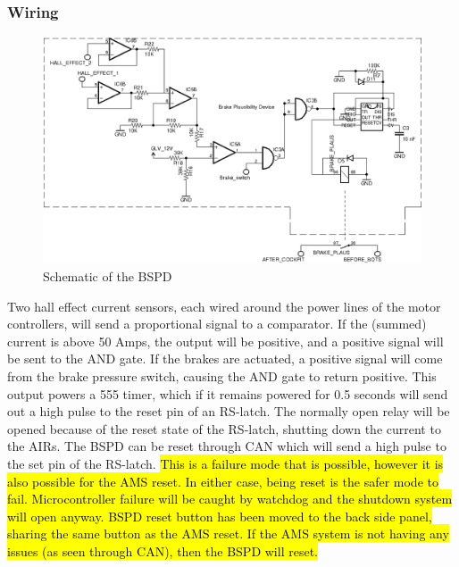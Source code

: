 \documentclass{article}
\DeclareRobustCommand{\hlr}[1]{{\sethlcolor{red}\hl{#1}}}
\begin{document}
        \subsubsection{Wiring}

            \begin{figure}[H]
                \centering
                \includegraphics[width = 0.9 \textwidth]{BSPD}
                \caption{Schematic of the BSPD}
                \label{BSPDschem}
            \end{figure}

Two hall effect current sensors, each wired around the power lines of the motor controllers, will send a proportional signal to a comparator. If the (summed) current is above 50 Amps, the output will be positive, and a positive signal will be sent to the AND gate. If the brakes are actuated, a positive signal will come from the brake pressure switch, causing the AND gate to return positive. This output powers a 555 timer, which if it remains powered for 0.5 seconds will send out a high pulse to the reset pin of an RS-latch. The normally open relay will be opened because of the reset state of the RS-latch, shutting down the current to the AIRs. The BSPD can be reset through CAN which will send a high pulse to the set pin of the RS-latch. \hlr{This is a failure mode that is possible, however it is also possible for the AMS reset. In either case, being reset is the safer mode to fail. Microcontroller failure will be caught by watchdog and the shutdown system will open anyway. BSPD reset button has been moved to the back side panel, sharing the same button as the AMS reset. If the AMS system is not having any issues (as seen through CAN), then the BSPD will reset.  }



\end{document}

